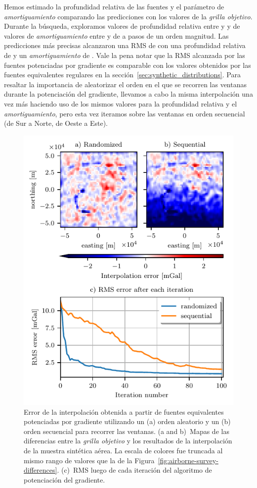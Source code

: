 Hemos estimado la profundidad relativa de las fuentes y el parámetro de
\emph{amortiguamiento} comparando las predicciones con los valores de la
\emph{grilla objetivo}.
Durante la búsqueda, exploramos valores de profundidad relativa entre
\EqlBoostAirborneMinDepth{} y
\EqlBoostAirborneMaxDepth{} y de valores de \emph{amortiguamiento} entre
\EqlBoostAirborneMinDamping{} y \EqlBoostAirborneMaxDamping{}
de a pasos de un orden magnitud.
Las predicciones más precisas alcanzaron una \ac{RMS} de
\EqlBoostAirborneRmsScore{} con una profundidad relativa de
\EqlBoostAirborneDepth{} y
un \emph{amortiguamiento} de \EqlBoostAirborneDamping{}.
Vale la pena notar que la \ac{RMS} alcanzada por las fuentes potenciadas por
gradiente es comparable con los valores obtenidos por las fuentes equivalentes
regulares en la sección~\ref{sec:synthetic_distributions}.
Para resaltar la importancia de aleatorizar el orden en el que se recorren las
ventanas durante la potenciación del gradiente, llevamos a cabo la misma
interpolación una vez más haciendo uso de los mismos valores para la profundidad
relativa y el \emph{amortiguamiento}, pero esta vez iteramos sobre las ventanas
en orden secuencial (de Sur a Norte, de Oeste a Este).

\begin{figure}
    \centering
    \includegraphics[width=0.7\linewidth]{figs/eql-gradient-boosted/eql-boost-airborne.pdf}
    \caption{
        Error de la interpolación obtenida a partir de fuentes equivalentes
        potenciadas por gradiente utilizando un (a) orden aleatorio y un (b)
        orden secuencial para recorrer las ventanas.
        (a and b)~Mapas de las diferencias entre la \emph{grilla objetivo}
        y los resultados de la interpolación de la muestra sintética aérea.
        La escala de colores fue truncada al mismo rango de valores que la de
        la Figura~\ref{fig:airborne-survey-differences}.
        (c)~\acl{RMS} luego de cada iteración del algoritmo de potenciación del
        gradiente.
}
\label{fig:eql-boost-airborne}
\end{figure}

